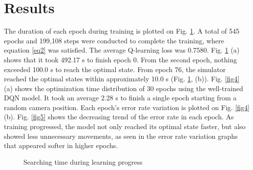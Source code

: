\documentclass[10pt]{article}
\begin{document}
\section{Results}
The duration of each epoch during training is plotted on Fig. \ref{fig3}. A total of 545 epochs and 199,108 steps were conducted to complete the training, where equation \ref{eq2} was satisfied. The average Q-learning loss was 0.7580. Fig. \ref{fig3} (a) shows that it took 492.17 s to finish epoch 0. From the second epoch, nothing exceeded 100.0 s to reach the optimal state. From epoch 76, the simulator reached the optimal states within approximately 10.0 s (Fig. \ref{fig3}, (b)). Fig. \ref{fig4} (a) shows the optimization time distribution of 30 epochs using the well-trained DQN model. It took an average 2.28 s to finish a single epoch starting from a random camera position. Each epoch's error rate variation is plotted on Fig. \ref{fig4} (b).
 Fig. \ref{fig5} shows the decreasing trend of the error rate in each epoch. As training progressed, the model not only reached its optimal state faster, but also showed less unnecessary movements, as seen in the error rate variation graphs that appeared softer in higher epochs.


\begin{figure}[htb]
\begin{center}
\caption{Searching time during learning progress}
\label{fig3}
\end{center}\end{figure}
\end{document}
